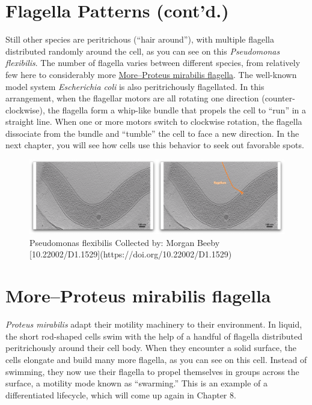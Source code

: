 \documentclass[]{tufte-book}
\begin{document}
\section{Flagella Patterns (cont'd.)}\label{flagella-patterns-contd.}

Still other species are peritrichous (``hair around''), with multiple
flagella distributed randomly around the cell, as you can see on this
\emph{Pseudomonas flexibilis}. The number of flagella varies between
different species, from relatively few here to considerably more
\protect\hyperlink{moreproteus-mirabilis-flagella}{More--Proteus
mirabilis flagella}. The well-known model system \emph{Escherichia coli}
is also peritrichously flagellated. In this arrangement, when the
flagellar motors are all rotating one direction (counter-clockwise), the
flagella form a whip-like bundle that propels the cell to ``run'' in a
straight line. When one or more motors switch to clockwise rotation, the
flagella dissociate from the bundle and ``tumble'' the cell to face a
new direction. In the next chapter, you will see how cells use this
behavior to seek out favorable spots.

\begin{figure}
\includegraphics{movie_stills/6_5} \caption[Pseudomonas flexibilis Collected by]{Pseudomonas flexibilis Collected by: Morgan Beeby [10.22002/D1.1529](https://doi.org/10.22002/D1.1529)}\label{fig:unnamed-chunk-108}
\end{figure}

\hypertarget{moreproteus-mirabilis-flagella}{\section{More--Proteus
mirabilis flagella}\label{moreproteus-mirabilis-flagella}}

\emph{Proteus mirabilis} adapt their motility machinery to their
environment. In liquid, the short rod-shaped cells swim with the help of
a handful of flagella distributed peritrichously around their cell body.
When they encounter a solid surface, the cells elongate and build many
more flagella, as you can see on this cell. Instead of swimming, they
now use their flagella to propel themselves in groups across the
surface, a motility mode known as ``swarming.'' This is an example of a
differentiated lifecycle, which will come up again in Chapter 8.
\end{document}
